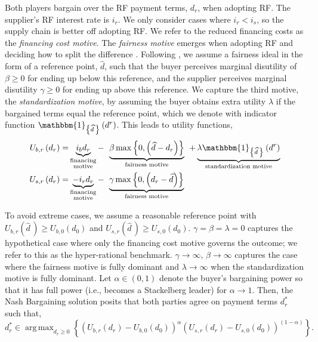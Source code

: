 \documentclass[a4paper,11pt]{article}
\newcommand{\dref}{\widehat d}
\renewcommand{\~}[1]{\tilde{#1}}
\renewcommand{\-}[1]{\overline{#1}}
\DeclareMathOperator*{\argmax}{arg\,max}
\begin{document}
Both players bargain over the RF payment terms, $d_r$, when adopting RF. The supplier's RF interest rate is $i_r$. We only consider cases where $i_r< i_s$, so the supply chain is better off adopting RF. We refer to the reduced financing costs as the \textit{financing cost motive}. The \textit{fairness motive} emerges when adopting RF and deciding how to split the difference \citep{banerjee2021}. Following \citet{Cappelen2007}, we assume a fairness ideal in the form of a reference point, $\dref$, such that the buyer perceives marginal disutility of $\beta\geq 0$ for ending up below this reference, and the supplier perceives marginal disutility $\gamma\geq 0$ for ending up above this reference. We capture the third motive, the \textit{standardization motive}, by assuming the buyer obtains extra utility $\lambda$ if the bargained terms equal the reference point, which we denote with indicator function $\mathbbm{1}_{\left\{\dref\,\right\}}\left(d^r\right)$. This leads to utility functions,%
\begin{equation}\label{eq:utilities}
    \begin{aligned}
    U_{b,r}\left(d_r\right) = & \underbrace{i_bd_r}_{\substack{\text{financing}\\\text{motive}}} -\;\, \underbrace{\beta \max\left\{0,\left(\dref-d_r\right)\right\}}_{\text{fairness motive}}  \;\,+\underbrace{\lambda \mathbbm{1}_{\left\{\dref\,\right\}}\left(d^r\right)}_{\text{standardization motive}}\\
    U_{s,r}\left(d_r\right) = & \underbrace{-i_rd_r}_{\substack{\text{financing}\\\text{motive}}} -\;\, \underbrace{\gamma \max\left\{0,\left(d_r-\dref\right)\right\}}_{\text{fairness motive}}
    \end{aligned}
\end{equation}  

To avoid extreme cases, we assume a reasonable reference point with $U_{b,r}\left(\dref\,\right)\geq U_{b,0}\left(d_0\right)$ and  $U_{s,r}\left(\dref\,\right)\geq U_{s,0}\left(d_0\right)$. $\gamma=\beta=\lambda=0$ captures the hypothetical case where only the financing cost motive governs the outcome; we refer to this as the hyper-rational benchmark. $\gamma\rightarrow\infty,\,\beta\rightarrow\infty$ captures the case where the fairness motive is fully dominant and $\lambda\rightarrow\infty$ when the standardization motive is fully dominant. Let $\alpha\in(0,1)$ denote the buyer's bargaining power so that it has full power (i.e., becomes a Stackelberg leader) for $\alpha\rightarrow 1$. Then, the Nash Bargaining solution \citep{Owen2013} posits that both parties agree on payment terms $d^{*}_r$ such that,
\begin{equation}\label{eq:obj}
d^{*}_r \in \argmax_{d_r\geq 0}\left\{
\left(
U_{b,r}\left(d_r\right) - U_{b,0}\left(d_0\right)
\right)^\alpha
\left(
U_{s,r}\left(d_r\right) - U_{s,0}\left(d_0\right)
\right)^{\left(1-\alpha\right)}
\right\}.
\end{equation}
\end{document}
